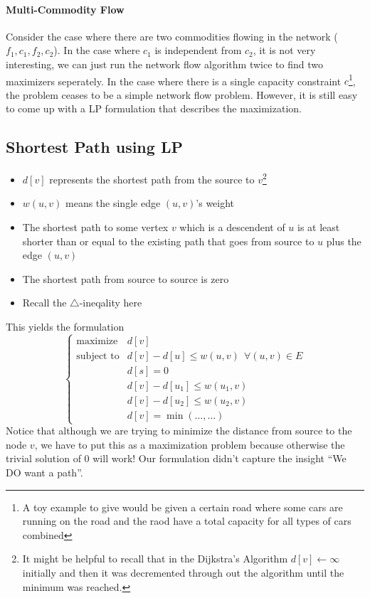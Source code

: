 \documentclass[10pt]{article}
\begin{document}
\paragraph{Multi-Commodity Flow} Consider the case where there are two commodities flowing in the network ($f_1, c_1, f_2, c_2$). In the case where $c_1$ is independent from $c_2$, it is not very interesting, we can just run the network flow algorithm twice to find two maximizers seperately. In the case where there is a single capacity constraint $c$\footnote{A toy example to give would be given a certain road where some cars are running on the road and the raod have a total capacity for all types of cars combined}, the problem ceases to be a simple network flow problem. However, it is still easy to come up with a LP formulation that describes the maximization. 

\subsection{Shortest Path using LP}
\begin{itemize}
    \item $d[v]$ represents the shortest path from the source to $v$\footnote{It might be helpful to recall that in the Dijkstra's Algorithm $d[v]\gets \infty$ initially and then it was decremented through out the algorithm until the minimum was reached.} 
    \item $w(u,v)$ means the single edge $(u,v)$'s weight
    \item The shortest path to some vertex $v$ which is a descendent of $u$ is at least shorter than or equal to the existing path that goes from source to $u$ plus the edge $(u,v)$
    \item The shortest path from source to source is zero
    \item Recall the $\triangle$-ineqality here
\end{itemize}
This yields the formulation
\begin{equation*}
    \begin{cases}
        \text{maximize} &d[v] \\
        \text{subject to} &d[v] - d[u] \leq w(u,v)~~\forall (u,v) \in E \\
        &d[s] = 0 \\
        &d[v] - d[u_1] \leq w(u_1, v) \\
        &d[v] - d[u_2] \leq w(u_2, v) \\
        &d[v] = \min(\dots,\dots)
    \end{cases}
\end{equation*}
Notice that although we are trying to minimize the distance from source to the node $v$, we have to put this as a maximization problem because otherwise the trivial solution of $0$ will work! Our formulation didn't capture the insight ``We DO want a path''.
\end{document}
